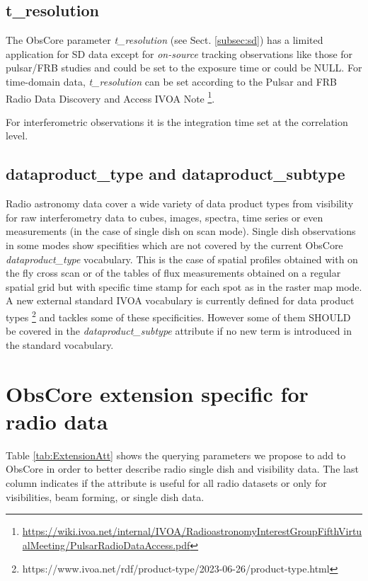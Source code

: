 \documentclass[11pt,a4paper]{ivoa}
\begin{document}
\subsection{t\_resolution}
The ObsCore parameter \emph{t\_resolution} (see Sect. \ref{subsec:sd}) has a limited application for SD data
except for \textit{on-source} tracking observations like those for pulsar/FRB studies and could be set to the
exposure time or could be NULL. For time-domain data, \emph{t\_resolution} can be set according to the Pulsar
and FRB Radio Data Discovery and Access IVOA Note \footnote{\url{https://wiki.ivoa.net/internal/IVOA/RadioastronomyInterestGroupFifthVirtualMeeting/PulsarRadioDataAccess.pdf}}.

For interferometric observations it is the integration time set at the correlation level.

\subsection{dataproduct\_type and dataproduct\_subtype}

Radio astronomy data cover a wide variety of data product types from visibility for raw interferometry data to cubes, images, spectra, time series
or even measurements (in the case of single dish on scan mode). Single dish observations in some modes show specifities which are not covered by
the current ObsCore \emph{dataproduct\_type} vocabulary. This is the case of spatial profiles obtained with on the fly cross scan or of the
tables of flux measurements obtained on a regular spatial grid but with specific time stamp for each spot as in the raster map  mode.
A new external standard IVOA vocabulary is currently defined for data product types \footnote{https://www.ivoa.net/rdf/product-type/2023-06-26/product-type.html}
and tackles some of these specificities. However some of them SHOULD be covered in the \emph{dataproduct\_subtype} attribute if no new term is introduced in the standard vocabulary.

\section{ObsCore extension specific for radio data}

Table \ref{tab:ExtensionAtt} shows the %
querying parameters we propose to add to ObsCore in order to better describe radio single dish and visibility data.
The last column indicates if the attribute is useful for all radio datasets or only for visibilities, beam forming, or single dish data.
\end{document}
